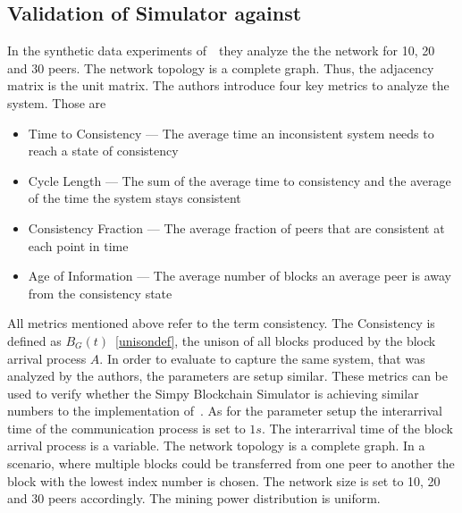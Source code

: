 \subsection{Validation of Simulator against~}\label{gopalananalysis}
In the synthetic data experiments of~~they analyze the the network for 10, 20 and 30 peers. The network topology is a complete graph. Thus, the adjacency matrix is the unit matrix. 
The authors introduce four key metrics to analyze the system. Those are 
\begin{itemize}
\item Time to Consistency --- The average time an inconsistent system needs to reach a state of consistency
\item Cycle Length --- The sum of the average time to consistency and the average of the time the system stays consistent
\item Consistency Fraction --- The average fraction of peers that are consistent at each point in time
\item Age of Information --- The average number of blocks an average peer is away from the consistency state
\end{itemize}
All metrics mentioned above refer to the term consistency. The Consistency is defined as $B_G(t)$~\ref{unisondef}, the unison of all blocks produced by the block arrival process $A$.
In order to evaluate to capture the same system, that was analyzed by the authors, the parameters are setup similar.
These metrics can be used to verify whether the Simpy Blockchain Simulator is achieving similar numbers to the implementation of~. As for the parameter setup the interarrival time of the communication process is set to $1s$. The interarrival time of the block arrival process is a variable. The network topology is a complete graph. In a scenario, where multiple blocks could be transferred from one peer to another the block with the lowest index number is chosen. The network size is set to 10, 20 and 30 peers accordingly. The mining power distribution is uniform.

